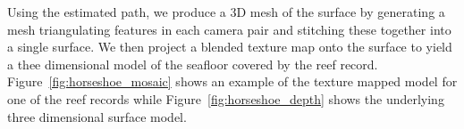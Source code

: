 Using the estimated path, we produce a 3D mesh of the surface by generating a mesh triangulating features in each camera pair and stitching these together into a single surface.  We then project a blended texture map onto the surface to yield a thee dimensional model of the seafloor covered by the reef record.  Figure~\ref{fig:horseshoe_mosaic} shows an example of the texture mapped model for one of the reef records while Figure~\ref{fig:horseshoe_depth} shows the underlying three dimensional surface model.